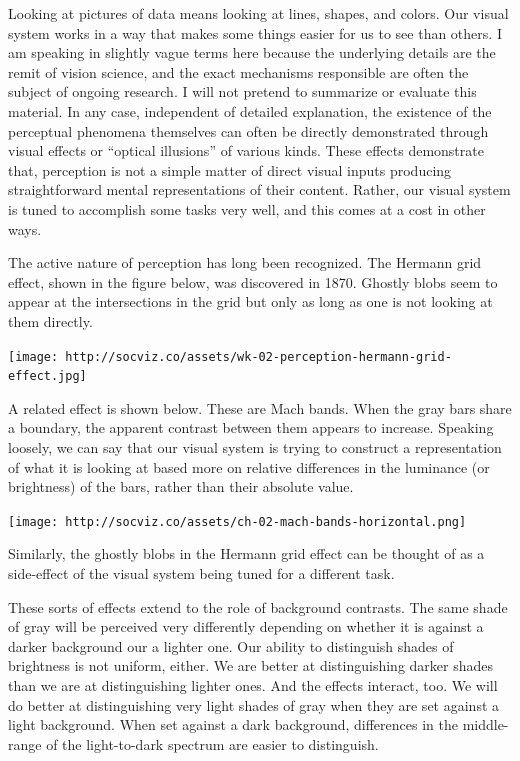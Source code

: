 \documentclass[]{book}
\theoremstyle{definition}
\theoremstyle{definition}
\theoremstyle{definition}
\theoremstyle{remark}
\begin{document}
Looking at pictures of data means looking at lines, shapes, and colors.
Our visual system works in a way that makes some things easier for us to
see than others. I am speaking in slightly vague terms here because the
underlying details are the remit of vision science, and the exact
mechanisms responsible are often the subject of ongoing research. I will
not pretend to summarize or evaluate this material. In any case,
independent of detailed explanation, the existence of the perceptual
phenomena themselves can often be directly demonstrated through visual
effects or ``optical illusions'' of various kinds. These effects
demonstrate that, perception is not a simple matter of direct visual
inputs producing straightforward mental representations of their
content. Rather, our visual system is tuned to accomplish some tasks
very well, and this comes at a cost in other ways.

The active nature of perception has long been recognized. The Hermann
grid effect, shown in the figure below, was discovered in 1870. Ghostly
blobs seem to appear at the intersections in the grid but only as long
as one is not looking at them directly.

\texttt{[image: http://socviz.co/assets/wk-02-perception-hermann-grid-effect.jpg]}

A related effect is shown below. These are Mach bands. When the gray
bars share a boundary, the apparent contrast between them appears to
increase. Speaking loosely, we can say that our visual system is trying
to construct a representation of what it is looking at based more on
relative differences in the luminance (or brightness) of the bars,
rather than their absolute value.

\texttt{[image: http://socviz.co/assets/ch-02-mach-bands-horizontal.png]}

Similarly, the ghostly blobs in the Hermann grid effect can be thought
of as a side-effect of the visual system being tuned for a different
task.

These sorts of effects extend to the role of background contrasts. The
same shade of gray will be perceived very differently depending on
whether it is against a darker background our a lighter one. Our ability
to distinguish shades of brightness is not uniform, either. We are
better at distinguishing darker shades than we are at distinguishing
lighter ones. And the effects interact, too. We will do better at
distinguishing very light shades of gray when they are set against a
light background. When set against a dark background, differences in the
middle-range of the light-to-dark spectrum are easier to distinguish.
\end{document}
